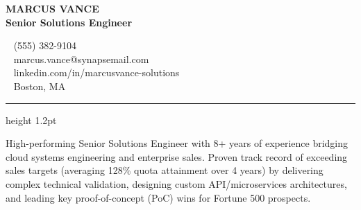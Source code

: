 \documentclass[10pt]{article}
\begin{document}
\begin{minipage}[b]{0.58\textwidth}
  {\Huge\bfseries\color{primary} MARCUS VANCE}\\
  \vspace{2pt}
  {\large\bfseries\color{accent} Senior Solutions Engineer}
\end{minipage}%
\hfill%
\begin{minipage}[b]{0.40\textwidth}
  \raggedleft\color{secondary}\small
  \faPhone~ (555) 382-9104\\
  \faEnvelope~ marcus.vance@synapsemail.com\\
  \faLinkedin~ linkedin.com/in/marcusvance-solutions\\
  \faMapMarker~ Boston, MA
\end{minipage}

\vspace{6pt}
\hrule height 1.2pt
\vspace{6pt}

High-performing Senior Solutions Engineer with 8+ years of experience bridging cloud systems engineering and enterprise sales. Proven track record of exceeding sales targets (averaging 128\% quota attainment over 4 years) by delivering complex technical validation, designing custom API/microservices architectures, and leading key proof-of-concept (PoC) wins for Fortune 500 prospects.

\vspace{6pt}
\end{document}

